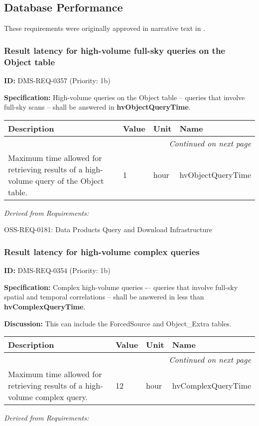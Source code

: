 \documentclass[SE,toc,lsstdraft]{lsstdoc}
\makeatletter
\newcommand{\paramname}[1]{\hspace{0pt}#1}
\newcommand{\unitname}[1]{\hspace{0pt}#1}
\newenvironment{parameters}[0]{%
\setlength\LTleft{0pt}
\setlength\LTright{\fill}
\begin{small}
\begin{longtable}[]{|p{0.49\textwidth}|l|p{0.6in}|p{1.70in}@{}|}

\hline \textbf{Description} & \textbf{Value} & \textbf{Unit} & \textbf{Name} \\ \hline
\endhead

\hline \multicolumn{4}{r}{\emph{Continued on next page}} \\
\endfoot

\hline\hline
\endlastfoot
}{%
\hline
\end{longtable}
\end{small}
}
\makeatother
\begin{document}
\subsection{Database Performance}

These requirements were originally approved in narrative text in .

\subsubsection{Result latency for high-volume full-sky queries on the Object table}

\label{DMS-REQ-0357}
\textbf{ID:} DMS-REQ-0357 (Priority: 1b)

\textbf{Specification:}
High-volume queries on the Object table -- queries that involve full-sky scans -- shall be answered in \textbf{hvObjectQueryTime}.

\begin{parameters}
Maximum time allowed for retrieving results of a high-volume query of the Object table.
&
1
&
\unitname{%
hour
}
&
\paramname{%
hvObjectQueryTime
} \\\hline
\end{parameters}

\emph{Derived from Requirements:}

OSS-REQ-0181:
Data Products Query and Download Infrastructure \newline

\subsubsection{Result latency for high-volume complex queries}

\label{DMS-REQ-0354}
\textbf{ID:} DMS-REQ-0354 (Priority: 1b)

\textbf{Specification:}
Complex high-volume queries -– queries that involve full-sky spatial and temporal correlations -- shall be answered in less than \textbf{hvComplexQueryTime}.

\textbf{Discussion:}
This can include the ForcedSource and Object\_Extra tables.

\begin{parameters}
Maximum time allowed for retrieving results of a high-volume complex query.
&
12
&
\unitname{%
hour
}
&
\paramname{%
hvComplexQueryTime
} \\\hline
\end{parameters}

\emph{Derived from Requirements:}
\end{document}
